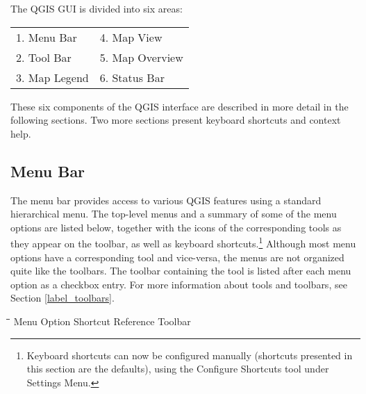 The QGIS GUI is divided into six areas:

\begin{tabular}{p{5cm} p{5cm}}
1. Menu Bar & 4. Map View \\
2. Tool Bar & 5. Map Overview \\
3. Map Legend & 6. Status Bar \\
\end{tabular}

These six components of the QGIS interface are described in more detail in
the following sections. Two more sections present keyboard shortcuts and
context help.


\subsection{Menu Bar}\label{label_menubar}

The menu bar provides access to various QGIS features using a standard
hierarchical menu. The top-level menus and a summary of some of the
menu options are listed below, together with the icons of the corresponding
tools as they appear on the toolbar, as well as keyboard
shortcuts.\footnote{Keyboard shortcuts can now be configured manually
(shortcuts presented in this section are the defaults), using the Configure
Shortcuts tool under Settings Menu.}
Although most menu options have a corresponding tool and vice-versa,
the menus are not organized quite like the toolbars.
The toolbar containing the tool is listed after each menu option as a checkbox
entry. For more information about tools and toolbars, see Section
\ref{label_toolbars}.

\begin{tabbing}
\hspace{5.5cm}\=\hspace{3cm}\=\hspace{3.5cm}\= \kill
\hspace{1cm} Menu Option \> Shortcut \> Reference \> Toolbar\\
\end{tabbing}


